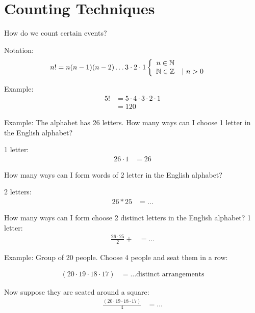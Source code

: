 \chapter{Counting Techniques}
\label{chap:CountingTechniques}
How do we count certain events?

Notation:
\begin{align}
  n! & = n(n-1)(n-2)\ldots 3 \cdot 2 \cdot 1 \left\{
    \begin{array}{c c}
      n \in \mathbb{N} \\
      \mathbb{N} \in \mathbb{Z} & | ~ n > 0 \\
    \end{array}
  \right.
\end{align}

Example:
\begin{align}
  5! &= 5 \cdot 4 \cdot 3 \cdot 2 \cdot 1 \\
     &= 120
\end{align}

Example: The alphabet has 26 letters. How many ways can I choose 1 letter in the
English alphabet?

1 letter:
\begin{align}
  26 \cdot 1 &= 26
\end{align}

How many ways can I form words of 2 letter in the English alphabet?

2 letters:
\begin{align}
  26 * 25 & = \ldots
\end{align}

How many ways can I form choose 2 distinct letters in the English alphabet?
1 letter:
\begin{align}
  \frac{26\cdot25}{2} + &= \ldots
\end{align}

Example: Group of 20 people. Choose 4 people and seat them in a row:

\begin{align}
  (20 \cdot 19 \cdot 18 \cdot 17) &= \ldots \text{distinct arrangements}
\end{align}

Now suppose they are seated around a square:
\begin{align}
  \frac{(20 \cdot 19 \cdot 18 \cdot 17)}{4} &= \ldots
\end{align}

